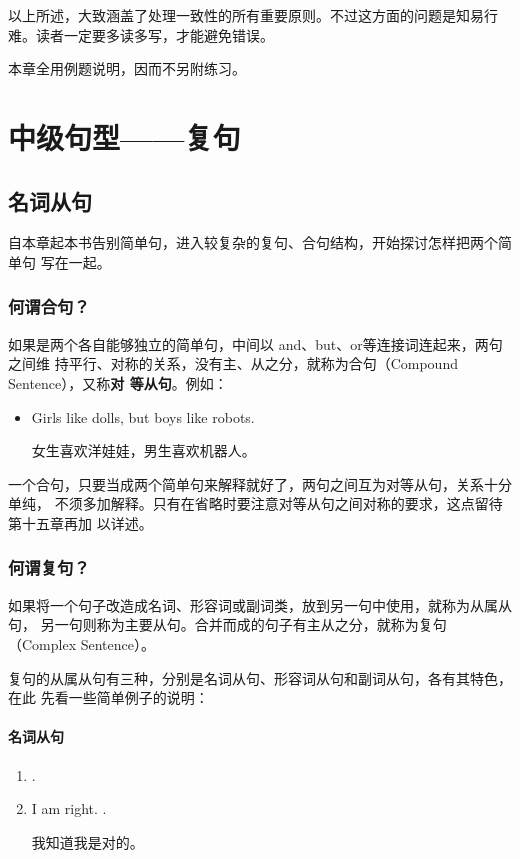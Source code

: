 以上所述，大致涵盖了处理一致性的所有重要原则。不过这方面的问题是知易行难。读者一定要多读多写，才能避免错误。

本章全用例题说明，因而不另附练习。

\part{中级句型——复句}

\chapter{名词从句}

自本章起本书告别简单句，进入较复杂的复句、合句结构，开始探讨怎样把两个简单句
写在一起。

\section{何谓合句？}

如果是两个各自能够独立的简单句，中间以 and、but、or等连接词连起来，两句之间维
持平行、对称的关系，没有主、从之分，就称为合句（Compound Sentence），又称\textbf{对
  等从句}。例如：

\begin{itemize}
\item   Girls like dolls, but boys like robots.

  女生喜欢洋娃娃，男生喜欢机器人。
\end{itemize}

一个合句，只要当成两个简单句来解释就好了，两句之间互为对等从句，关系十分单纯，
不须多加解释。只有在省略时要注意对等从句之间对称的要求，这点留待第十五章再加
以详述。

\section{何谓复句？}

如果将一个句子改造成名词、形容词或副词类，放到另一句中使用，就称为从属从句，
另一句则称为主要从句。合并而成的句子有主从之分，就称为复句（Complex
Sentence）。

复句的从属从句有三种，分别是名词从句、形容词从句和副词从句，各有其特色，在此
先看一些简单例子的说明：

\subsection{名词从句}

\begin{enumerate}
\item {}  .
\item I am right.
\reitem {}  .

我知道我是对的。
\end{enumerate}

